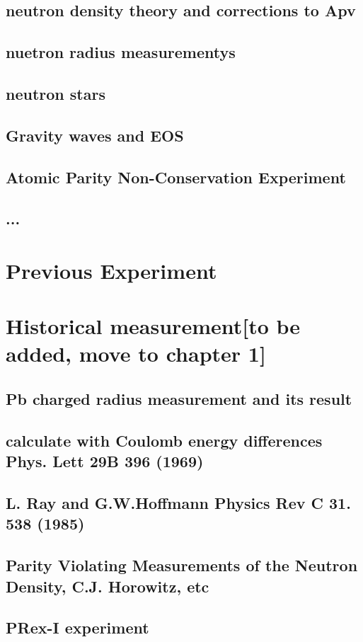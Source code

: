 \subsection{neutron density theory and corrections to Apv}
\subsection{nuetron radius measurementys}
\subsection{neutron stars}
\subsection{Gravity waves and EOS}
\subsection{Atomic Parity Non-Conservation Experiment}
\subsection{...}
\section{Previous Experiment}


\section{Historical measurement[to be added, move to chapter 1]}
\subsection{Pb charged radius measurement and its result }
\subsection{calculate with Coulomb energy differences Phys. Lett 29B 396 (1969)}
\subsection{L. Ray and G.W.Hoffmann Physics Rev C 31. 538 (1985)}
\subsection{ Parity Violating Measurements of the Neutron Density, C.J. Horowitz, etc}
\subsection{PRex-I experiment}
